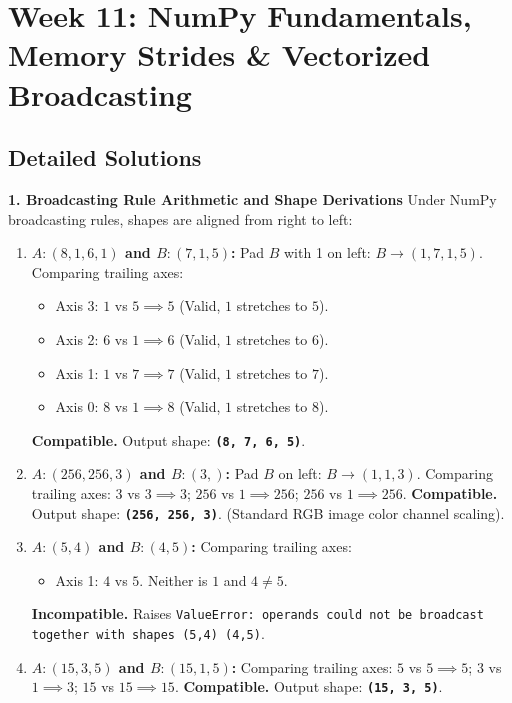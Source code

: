 \section*{Week 11: NumPy Fundamentals, Memory Strides \& Vectorized Broadcasting}

\subsection*{Detailed Solutions}

\textbf{1. Broadcasting Rule Arithmetic and Shape Derivations}
Under NumPy broadcasting rules, shapes are aligned from right to left:
\begin{enumerate}
    \item \textbf{$A: (8, 1, 6, 1)$ and $B: (7, 1, 5)$:}
    Pad $B$ with 1 on left: $B \to (1, 7, 1, 5)$.
    Comparing trailing axes:
    \begin{itemize}
        \item Axis 3: $1$ vs $5 \implies 5$ (Valid, $1$ stretches to $5$).
        \item Axis 2: $6$ vs $1 \implies 6$ (Valid, $1$ stretches to $6$).
        \item Axis 1: $1$ vs $7 \implies 7$ (Valid, $1$ stretches to $7$).
        \item Axis 0: $8$ vs $1 \implies 8$ (Valid, $1$ stretches to $8$).
    \end{itemize}
    \textbf{Compatible.} Output shape: \textbf{\texttt{(8, 7, 6, 5)}}.

    \item \textbf{$A: (256, 256, 3)$ and $B: (3,)$:}
    Pad $B$ on left: $B \to (1, 1, 3)$.
    Comparing trailing axes: $3$ vs $3 \implies 3$; $256$ vs $1 \implies 256$; $256$ vs $1 \implies 256$.
    \textbf{Compatible.} Output shape: \textbf{\texttt{(256, 256, 3)}}. (Standard RGB image color channel scaling).

    \item \textbf{$A: (5, 4)$ and $B: (4, 5)$:}
    Comparing trailing axes:
    \begin{itemize}
        \item Axis 1: $4$ vs $5$. Neither is $1$ and $4 \neq 5$.
    \end{itemize}
    \textbf{Incompatible.} Raises \texttt{ValueError: operands could not be broadcast together with shapes (5,4) (4,5)}.

    \item \textbf{$A: (15, 3, 5)$ and $B: (15, 1, 5)$:}
    Comparing trailing axes: $5$ vs $5 \implies 5$; $3$ vs $1 \implies 3$; $15$ vs $15 \implies 15$.
    \textbf{Compatible.} Output shape: \textbf{\texttt{(15, 3, 5)}}.
\end{enumerate}

